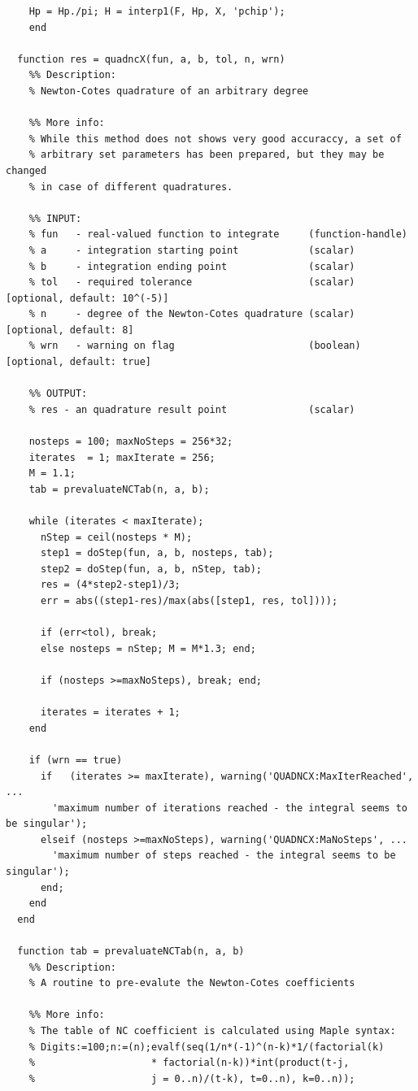 \documentclass[12pt,twoside,a4paper]{article}
\numberwithin{equation}{subsection}
\numberwithin{figure}{subsection}
\begin{document}
\begin{lstlisting}
    Hp = Hp./pi; H = interp1(F, Hp, X, 'pchip');
	end
	
  function res = quadncX(fun, a, b, tol, n, wrn)
    %% Description:
    % Newton-Cotes quadrature of an arbitrary degree

    %% More info:
    % While this method does not shows very good accuraccy, a set of
    % arbitrary set parameters has been prepared, but they may be changed
    % in case of different quadratures.

    %% INPUT:
    % fun   - real-valued function to integrate     (function-handle)
    % a     - integration starting point            (scalar)
    % b     - integration ending point              (scalar)
    % tol   - required tolerance                    (scalar)  [optional, default: 10^(-5)]
    % n     - degree of the Newton-Cotes quadrature (scalar)  [optional, default: 8]
    % wrn   - warning on flag                       (boolean) [optional, default: true]

    %% OUTPUT:
    % res - an quadrature result point              (scalar)

    nosteps = 100; maxNoSteps = 256*32;
    iterates  = 1; maxIterate = 256;
    M = 1.1;
    tab = prevaluateNCTab(n, a, b);

    while (iterates < maxIterate);
      nStep = ceil(nosteps * M);
      step1 = doStep(fun, a, b, nosteps, tab);
      step2 = doStep(fun, a, b, nStep, tab);
      res = (4*step2-step1)/3; 
      err = abs((step1-res)/max(abs([step1, res, tol])));

      if (err<tol), break;
      else nosteps = nStep; M = M*1.3; end;

      if (nosteps >=maxNoSteps), break; end;

      iterates = iterates + 1;
    end

    if (wrn == true)
      if   (iterates >= maxIterate), warning('QUADNCX:MaxIterReached', ...
        'maximum number of iterations reached - the integral seems to be singular'); 
      elseif (nosteps >=maxNoSteps), warning('QUADNCX:MaNoSteps', ...
        'maximum number of steps reached - the integral seems to be singular');  
      end; 
    end
  end
	
  function tab = prevaluateNCTab(n, a, b)
    %% Description:
    % A routine to pre-evalute the Newton-Cotes coefficients

    %% More info:
    % The table of NC coefficient is calculated using Maple syntax:
    % Digits:=100;n:=(n);evalf(seq(1/n*(-1)^(n-k)*1/(factorial(k)
    %                    * factorial(n-k))*int(product(t-j, 
    %                    j = 0..n)/(t-k), t=0..n), k=0..n));


\end{lstlisting}
\end{document}
